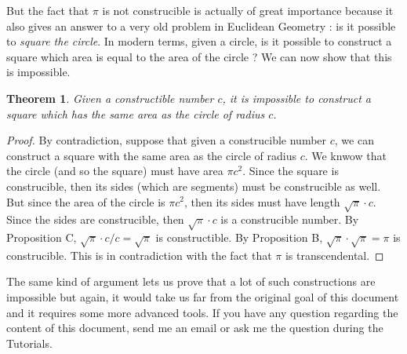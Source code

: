 \documentclass{article}
\theoremstyle{plain}
\newtheorem*{theorem*}{Theorem}
\theoremstyle{definition}
\begin{document}
But the fact that $\pi$ is not construcible is actually of great importance because it also gives an answer to a very old problem in Euclidean Geometry : is it possible to \textit{square the circle}. In modern terms, given a circle, is it possible to construct a square which area is equal to the area of the circle ? We can now show that this is impossible. \\

\begin{theorem*}
    Given a constructible number $c$, it is impossible to construct a square which has the same area as the circle of radius $c$.
\end{theorem*}

\begin{proof}
    By contradiction, suppose that given a construcible number $c$, we can construct a square with the same area as the circle of radius $c$. We knwow that the circle (and so the square) must have area $\pi c^2$. Since the square is construcible, then its sides (which are segments) must be construcible as well. But since the area of the circle is $\pi c^2$, then its sides must have length $\sqrt{\pi} \cdot c$. Since the sides are construcible, then $\sqrt{\pi} \cdot c$ is a construcible number. By Proposition C, $\sqrt{\pi} \cdot c / c = \sqrt{\pi}$ is constructible. By Proposition B, $\sqrt{\pi} \cdot \sqrt{\pi} = \pi$ is construcible. This is in contradiction with the fact that $\pi$ is transcendental.
\end{proof}

The same kind of argument lets us prove that a lot of such constructions are impossible but again, it would take us far from the original goal of this document and it requires some more advanced tools. If you have any question regarding the content of this document, send me an email or ask me the question during the Tutorials.
\end{document}
